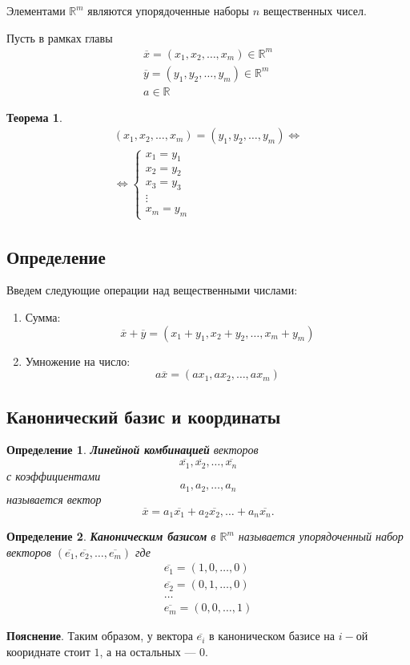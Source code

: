 \documentclass[]{article}
\theoremstyle{theorem}
\newtheorem{thr}{Теорема}
\newtheorem{dfn}{Определение}
\theoremstyle{definition}
\begin{document}
	Элементами $\mathbb{R}^m$ являются упорядоченные наборы $n$ вещественных чисел.
	
	Пусть в рамках главы \begin{gather*}
		\overline{x}=(x_1, x_2, \ldots, x_m)\in \mathbb{R}^m 
		\\
		\overline{y}=(y_1, y_2, \ldots, y_m)\in \mathbb{R}^m 
		\\
		a\in \mathbb{R}
	\end{gather*}
	
	\begin{thr}
		\begin{gather*}
			(x_1, x_2, \ldots, x_m)=(y_1, y_2, \ldots, y_m)\Leftrightarrow
			\\
			\Leftrightarrow
			\begin{cases}
				x_1=y_1
				\\
				x_2=y_2
				\\
				x_3=y_3
				\\
				\vdots
				\\
				x_m=y_m
			\end{cases}
		\end{gather*}
	\end{thr}
	
	\subsection{Определение}
	Введем следующие операции над вещественными числами:\begin{enumerate}
		\item Сумма: $$\overline{x}+\overline{y}=
		(x_1+y_1, x_2+y_2, \ldots, x_m+y_m)$$
		\item Умножение на число: $$a\overline{x}=
		(ax_1, ax_2, \ldots, ax_m)$$
	\end{enumerate}
	
	\subsection{Канонический базис и координаты}
	\begin{dfn}\label{df1}
		\textbf{Линейной комбинацией} векторов 
		$$
		\overline{x_1}, \overline{x_2},\ldots, \overline{x_n}
		$$
		с коэффициентами 
		$$
		a_1,a_2,\ldots, a_n
		$$
		называется вектор $$\overline{x}=a_1\overline{x_1}+ a_2\overline{x_2},\ldots+ a_n\overline{x_n}.$$
	\end{dfn}
	
	\begin{dfn}
		\textbf{Каноническим базисом} в $\mathbb{R}^m$ называется упорядоченный набор векторов $(\overline{e_1}, \overline{e_2}, \ldots, \overline{e_m})$ где
		\begin{gather*}
			\overline{e_1} = (1,0,\ldots,0)
			\\
			\overline{e_2} = (0,1,\ldots,0)
			\\
			\ldots
			\\
			\overline{e_m} = (0,0,\ldots,1)
		\end{gather*}
	\end{dfn}
	\textbf{Пояснение}. Таким образом, у вектора $\overline{e_i}$ в каноническом базисе на $i-$ой коориднате стоит $1$, а на остальных --- $0$.
	
\end{document}

